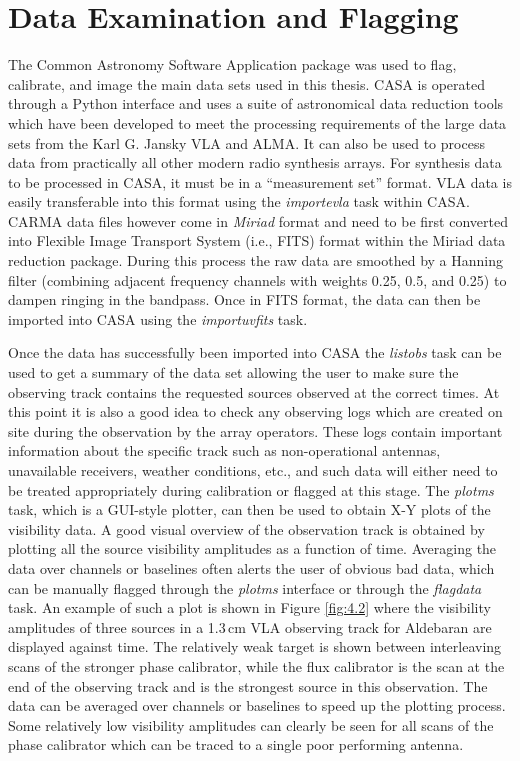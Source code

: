 \section{Data Examination and Flagging}\label{sec:4.1}
The Common Astronomy Software Application \citep[CASA;][]{mcmullin_2007} package was used to flag, calibrate, and image the main data sets used in this thesis. CASA is operated through a Python interface and uses a suite of astronomical data reduction tools which have been developed to meet the processing requirements of the large  data sets from the Karl G. Jansky VLA and ALMA. It can also be used to process data from practically all other modern radio synthesis arrays. For synthesis data to be processed in CASA, it must be in a ``measurement set'' format. VLA data is easily transferable into this format using the \textit{importevla} task within CASA. CARMA data files however come in \textit{Miriad} format and need to be first converted into Flexible Image Transport System (i.e., FITS) format within the Miriad \citep{sault_1995} data reduction package. During this process the raw data are smoothed by a Hanning filter (combining adjacent frequency channels with weights 0.25, 0.5, and 0.25) to dampen ringing in the bandpass. Once in FITS format, the data can then be imported into CASA using the \textit{importuvfits} task.

Once the data has successfully been imported into CASA the \textit{listobs} task can be used to get a summary of the data set allowing the user to make sure the observing track contains the requested sources observed at the correct times. At this point it is also a good idea to check any observing logs which are created on site during the observation by the array operators. These logs contain important information about the specific track such as non-operational antennas, unavailable receivers, weather conditions, etc., and such data will either need to be treated appropriately during calibration or flagged at this stage. The \textit{plotms} task, which is a GUI-style plotter, can then be used to obtain X-Y plots of the visibility data. A good visual overview of the observation track is obtained by plotting all the source visibility amplitudes as a function of time. Averaging the data over channels or baselines often alerts the user of obvious bad data, which can be manually flagged through the \textit{plotms} interface or through the \textit{flagdata} task. An example of such a plot is shown in Figure \ref{fig:4.2} where the visibility amplitudes of three sources in a 1.3\,cm VLA observing track for Aldebaran are displayed against time. The relatively weak target is shown between interleaving scans of the stronger phase calibrator, while the flux calibrator is the scan at the end of the observing track and is the strongest source in this observation. The data can be averaged over channels or baselines to speed up the plotting process. Some relatively low visibility amplitudes can clearly be seen for all scans of the phase calibrator which can be traced to a single poor performing antenna.

